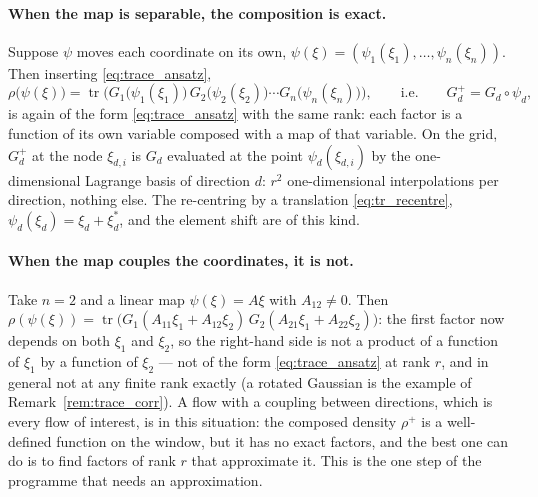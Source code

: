\documentclass[11pt,a4paper]{article}
\newcommand{\tr}{\operatorname{tr}}
\theoremstyle{plain}
\theoremstyle{definition}
\theoremstyle{remark}
\begin{document}
\paragraph{When the map is separable, the composition is exact.}
Suppose $\psi$ moves each coordinate on its own, $\psi(\xi)=(\psi_1(\xi_1),\dots,\psi_n(\xi_n))$. Then inserting \eqref{eq:trace_ansatz},
\begin{equation}
  \rho\big(\psi(\xi)\big) = \tr\Big(G_1\big(\psi_1(\xi_1)\big)\,G_2\big(\psi_2(\xi_2)\big)\cdots G_n\big(\psi_n(\xi_n)\big)\Big),
  \qquad\text{i.e.}\qquad G_d^+ = G_d\circ\psi_d ,
  \label{eq:trace_drift_sep}
\end{equation}
is again of the form \eqref{eq:trace_ansatz} with the same rank: each factor is a function of its own variable composed with a map of that variable. On the grid, $G_d^+$ at the node $\xi_{d,i}$ is $G_d$ evaluated at the point $\psi_d(\xi_{d,i})$ by the one-dimensional Lagrange basis of direction $d$: $r^2$ one-dimensional interpolations per direction, nothing else. The re-centring by a translation \eqref{eq:tr_recentre}, $\psi_d(\xi_d)=\xi_d+\xi^*_d$, and the element shift are of this kind.

\paragraph{When the map couples the coordinates, it is not.}
Take $n=2$ and a linear map $\psi(\xi)=A\xi$ with $A_{12}\ne0$. Then $\rho(\psi(\xi)) = \tr\big(G_1(A_{11}\xi_1+A_{12}\xi_2)\,G_2(A_{21}\xi_1+A_{22}\xi_2)\big)$: the first factor now depends on both $\xi_1$ and $\xi_2$, so the right-hand side is not a product of a function of $\xi_1$ by a function of $\xi_2$ --- not of the form \eqref{eq:trace_ansatz} at rank $r$, and in general not at any finite rank exactly (a rotated Gaussian is the example of Remark~\ref{rem:trace_corr}). A flow with a coupling between directions, which is every flow of interest, is in this situation: the composed density $\rho^+$ is a well-defined function on the window, but it has no exact factors, and the best one can do is to find factors of rank $r$ that approximate it. This is the one step of the programme that needs an approximation.
\end{document}

